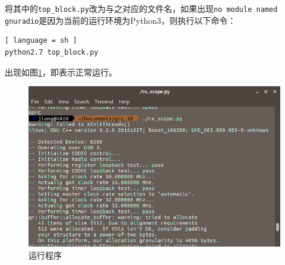 		\par 将其中的\lstinline[language=sh]{top_block.py}改为与之对应的文件名，如果出现\lstinline[language=sh]{no module named gnuradio}是因为当前的运行环境为Python3，则执行以下命令：
		\begin{lstlisting}[ language = sh ]
python2.7 top_block.py
		\end{lstlisting}
		\par 出现如图\ref{fig:dvbt_runtime}，即表示正常运行。
		\begin{figure}[htp]
			\centering
			\includegraphics[width=13cm]{figures/dvbt_runtime.png}
			\caption{运行程序}
			\label{fig:dvbt_runtime}
		\end{figure}
		
				
